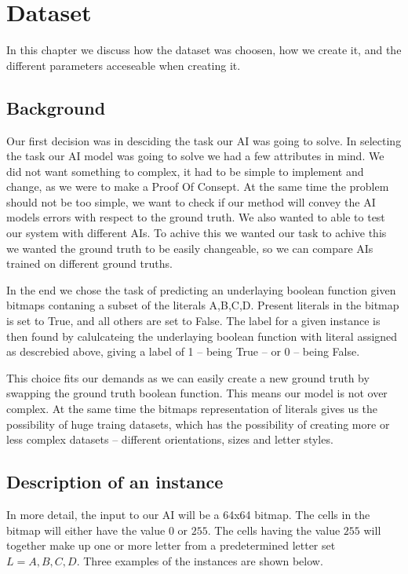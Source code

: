 \chapter{Dataset}

In this chapter we discuss how the dataset was choosen, how we create it, and the different parameters 
acceseable when creating it. 

\section{Background}

Our first decision was in desciding the task our AI was going to solve.
In selecting the task our AI model was going to solve we had a few attributes in mind. We did not want something to complex,
it had to be simple to implement and change,  as we were to make a Proof Of Consept. At the same time the problem should not be too simple,
we want to check if our method will convey the AI models errors with respect to the ground truth.
We also wanted to able to test our system with different AIs. To achive this we wanted our task to achive this we wanted the ground truth
to be easily changeable, so we can compare AIs trained on different ground truths.

In the end we chose the task of predicting an underlaying boolean function given bitmaps contaning a subset of the literals {A,B,C,D}.
Present literals in the bitmap is set to True, and all others are set to False. The label for a given instance is 
then found by calulcateing the underlaying boolean function with literal assigned as descrebied above, giving a label of
1 – being True – or 0 – being False.

This choice fits our demands as we can easily create a new ground truth by swapping the ground truth boolean function. This means our model is not over complex. 
At the same time the bitmaps representation of literals gives us the possibility of huge traing datasets, which has the possibility of creating
more or less complex datasets – different orientations, sizes and letter styles. 

\section{Description of an instance}

In more detail, the input to our AI will be a 64x64 bitmap. The cells in the bitmap will either have the value $0$ or $255$.
The cells having the value $255$ will together make up one or more letter from a predetermined letter set $L = {A,B,C,D}$.
Three examples of the instances are shown below.
 

